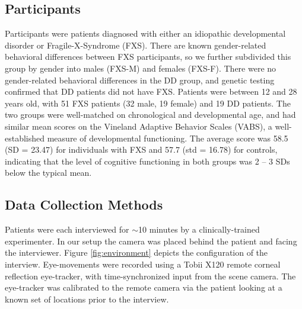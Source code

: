 \documentclass[10pt,twocolumn,letterpaper]{article}
\begin{document}
\subsection{Participants}
Participants were patients diagnosed with either an idiopathic developmental disorder or Fragile-X-Syndrome (FXS). There are known gender-related behavioral differences between FXS participants, so we further subdivided this group by gender into males (FXS-M) and females (FXS-F). There were no gender-related behavioral differences in the DD group, and genetic testing confirmed that DD patients did not have FXS. Patients were between 12 and 28 years old, with 51 FXS patients (32 male, 19 female) and 19 DD patients. The two groups were well-matched on chronological and developmental age, and had similar mean scores on the Vineland Adaptive Behavior Scales (VABS), a well-established measure of developmental functioning. The average score was 58.5 (SD = 23.47) for individuals with FXS and 57.7 (std = 16.78) for controls, indicating that the level of cognitive functioning in both groups was 2 -- 3 SDs below the typical mean.


\subsection {Data Collection Methods}
Patients were each interviewed for $\sim$10 minutes by a clinically-trained experimenter. In our setup the camera was placed behind the patient and facing the interviewer. 
Figure \ref{fig:environment} depicts the configuration of the interview. Eye-movements were recorded using a Tobii X120 remote corneal reflection eye-tracker, with time-synchronized input from the scene camera. The eye-tracker was calibrated to the remote camera via the patient looking at a known set of locations prior to the interview.
\end{document}
